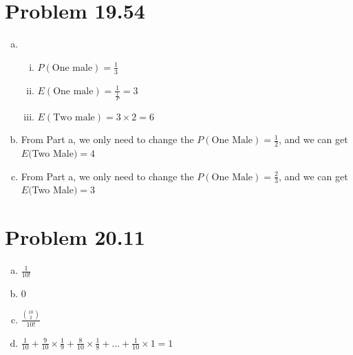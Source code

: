 \documentclass{article}
\def\math#1{$#1$}
\begin{document}
\section{Problem 19.54}
\begin{enumerate}[a)]
    \item 
        \begin{enumerate}[i)]
            \item \math{P(\text{One male}) = \frac{1}{3}}
            \item \math{E(\text{One male}) = \frac{1}{\frac{1}{P}} = 3}
            \item \math{E(\text{Two male}) = 3 \times 2 = 6}
        \end{enumerate}
    \item From Part a, we only need to change the \math{P(\text{One Male}) = \frac{1}{2}}, and we can get \math{E(\math{Two Male}) = 4}
    \item From Part a, we only need to change the \math{P(\text{One Male}) = \frac{2}{3}}, and we can get \math{E(\math{Two Male}) = 3}
\end{enumerate}

\section{Problem 20.11}
\begin{enumerate}[a)]
    \item \math{\frac{1}{10!}}
    \item 0
    \item \math{\frac{\binom{10}{2}}{10!}}
    \item \math{\frac{1}{10} + \frac{9}{10} \times \frac{1}{9} + \frac{8}{10} \times \frac{1}{8} + ... + \frac{1}{10} \times 1 = 1}
\end{enumerate}
\end{document}
